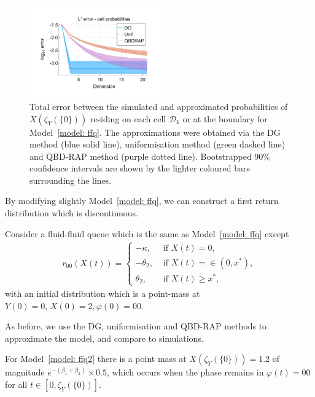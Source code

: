 \begin{figure}[h]
	\centering
	\includegraphics[width=0.5\textwidth,trim={0.75cm 0.8cm 0.25cm 1.25cm},clip]{chapter6/figs/ffq/cts/l1_cell_probs_error_formatted.pdf}%
	\caption{Total error between the simulated and approximated probabilities of \(X(\zeta_{Y}(\{0\}))\) residing on each cell \(\mathcal D_k\) or at the boundary for Model~\ref{model: ffq}. The approximations were obtained via the DG method (blue solid line), uniformisation method (green dashed line) and QBD-RAP method (purple dotted line). Bootstrapped 90\% confidence intervals are shown by the lighter coloured bars surrounding the lines.} 
	\label{fig: ffq cell probs} 
\end{figure}
\exampleFloatBarrier
By modifying slightly Model~\ref{model: ffq}, we can construct a first return distribution which is discontinuous. 
\begin{model}\label{model: ffq2}
	Consider a fluid-fluid queue which is the same as Model~\ref{model: ffq} except 
	\begin{align}
		r_{00}(X(t)) = \begin{cases}
			-\kappa, & \mbox{ if }X(t)=0,\\
			-\theta_2, & \mbox{ if }X(t)=\in(0,x^*),\\
			\theta_2, & \mbox{ if }X(t)\geq x^*,
		\end{cases}
	\end{align}
	with an initial distribution which is a point-mass at \(Y(0)=0,\, X(0)=2, \varphi(0)=00\). 
\end{model}
As before, we use the DG, uniformisation and QBD-RAP methods to approximate the model, and compare to simulations. 

For Model~\ref{model: ffq2} there is a point mass at \(X(\zeta_{Y}(\{0\}))=1.2\) of magnitude \(e^{-(\beta_1+\beta_2)}\times 0.5\), which occurs when the phase remains in \(\varphi(t)=00\) for all \(t\in [0,\zeta_{Y}(\{0\})]\).


